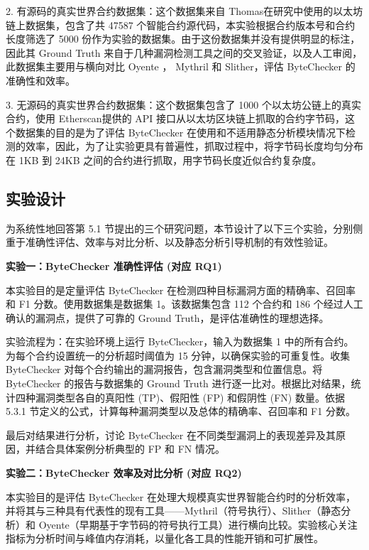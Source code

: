 \documentclass[print, master, vlined, timesmath]{DissertUESTC}
\begin{document}
2. 有源码的真实世界合约数据集：这个数据集来自 Thomas\textsuperscript{\cite{Durieux_2020}}在研究中使用的以太坊链上数据集，包含了共 47587 个智能合约源代码，本实验根据合约版本号和合约长度筛选了 5000 份作为实验的数据集。由于这份数据集并没有提供明显的标注，因此其 Ground Truth 来自于几种漏洞检测工具之间的交叉验证，以及人工审阅，此数据集主要用与横向对比 Oyente ， Mythril 和 Slither\textsuperscript{\cite{Feist_2019}}，评估 ByteChecker 的准确性和效率。

3. 无源码的真实世界合约数据集：这个数据集包含了 1000 个以太坊公链上的真实合约，使用 Etherscan\textsuperscript{\cite{etherscan}}提供的 API 接口从以太坊区块链上抓取的合约字节码，这个数据集的目的是为了评估 ByteChecker 在使用和不适用静态分析模块情况下检测的效率，因此，为了让实验更具有普遍性，抓取过程中，将字节码长度均匀分布在 1KB 到 24KB 之间的合约进行抓取，用字节码长度近似合约复杂度。
\subsection{实验设计}

为系统性地回答第 5.1 节提出的三个研究问题，本节设计了以下三个实验，分别侧重于准确性评估、效率与对比分析、以及静态分析引导机制的有效性验证。

\textbf{实验一：ByteChecker 准确性评估 (对应 RQ1)}

本实验目的是定量评估 ByteChecker 在检测四种目标漏洞方面的精确率、召回率和 F1 分数。使用数据集是数据集 1。该数据集包含 112 个合约和 186 个经过人工确认的漏洞点，提供了可靠的 Ground Truth，是评估准确性的理想选择。

实验流程为：在实验环境上运行 ByteChecker，输入为数据集 1 中的所有合约。为每个合约设置统一的分析超时阈值为 15 分钟，以确保实验的可重复性。收集 ByteChecker 对每个合约输出的漏洞报告，包含漏洞类型和位置信息。将 ByteChecker 的报告与数据集的 Ground Truth 进行逐一比对。根据比对结果，统计四种漏洞类型各自的真阳性 (TP)、假阳性 (FP) 和假阴性 (FN) 数量。依据 5.3.1 节定义的公式，计算每种漏洞类型以及总体的精确率、召回率和 F1 分数。

最后对结果进行分析，讨论 ByteChecker 在不同类型漏洞上的表现差异及其原因，并结合具体案例分析典型的 FP 和 FN 情况。

\textbf{实验二：ByteChecker 效率及对比分析 (对应 RQ2)}

本实验目的是评估 ByteChecker 在处理大规模真实世界智能合约时的分析效率，并将其与三种具有代表性的现有工具——Mythril（符号执行）、Slither（静态分析）和 Oyente（早期基于字节码的符号执行工具）进行横向比较。实验核心关注指标为分析时间与峰值内存消耗，以量化各工具的性能开销和可扩展性。
\end{document}
